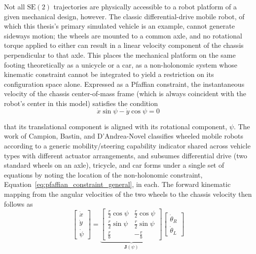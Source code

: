 Not all $\mathrm{SE}(2)$ trajectories are physically accessible to a robot platform of a given mechanical design, however. The classic differential-drive mobile robot, of which this thesis's primary simulated vehicle is an example, cannot generate sideways motion; the wheels are mounted to a common axle, and no rotational torque applied to either can result in a linear velocity component of the chassis perpendicular to that axle. This places the mechanical platform on the same footing theoretically as a unicycle or a car, as a non-holonomic system whose kinematic constraint cannot be integrated to yield a restriction on its configuration space alone. Expressed as a Pfaffian constraint, the instantaneous velocity of the chassis center-of-mass frame (which is always coincident with the robot's center in this model) satisfies the condition
\begin{equation}
\dot{x} \sin\psi - \dot{y} \cos\psi = 0 \label{eq:pfaffian_constraint_general}
\end{equation}

that its translational component is aligned with its rotational component, $\psi$. The work of Campion, Bastin, and D'Andrea-Novel \cite{campion1996structural} classifies wheeled mobile robots according to a generic mobility/steering capability indicator shared across vehicle types with different actuator arrangements, and subsumes differential drive (two standard wheels on an axle), tricycle, and car forms under a single set of equations by noting the location of the non-holonomic constraint, Equation~\eqref{eq:pfaffian_constraint_general}, in each. The forward kinematic mapping from the angular velocities of the two wheels to the chassis velocity then follows as
\begin{equation}
\begin{bmatrix} \dot{x} \\ \dot{y} \\ \dot{\psi} \end{bmatrix} = \underbrace{\begin{bmatrix} \frac{r}{2}\cos\psi & \frac{r}{2}\cos\psi \\ \frac{r}{2}\sin\psi & \frac{r}{2}\sin\psi \\ \frac{r}{b} & -\frac{r}{b} \end{bmatrix}}_{\mathbf{J}(\psi)} \begin{bmatrix} \dot{\theta}_R \\ \dot{\theta}_L \end{bmatrix} \label{eq:differential_drive_jacobian_general}
\end{equation}

